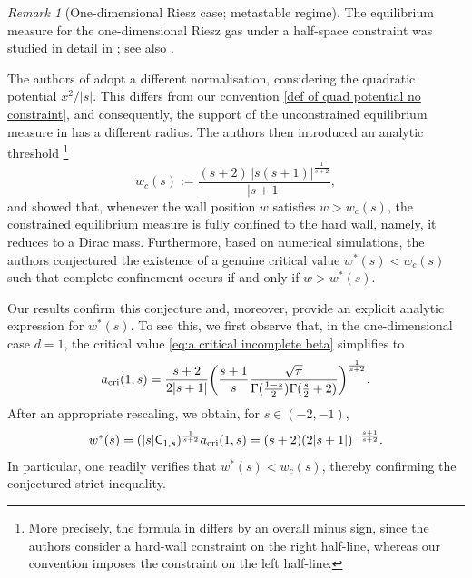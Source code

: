 \documentclass{amsart}
\theoremstyle{plain}
\theoremstyle{remark}
\newtheorem{rem}{Remark}%
\numberwithin{equation}{section}
\begin{document}
 
\begin{rem}[One-dimensional Riesz case; metastable regime] The equilibrium measure for the one-dimensional Riesz gas under a half-space constraint was studied in detail in \cite{KKKMMS21}; see also \cite{KKKMMS22,KKKMMS24}. 

The authors of \cite{KKKMMS21} adopt a different normalisation, considering the quadratic potential $x^2/|s|$. This differs from our convention \eqref{def of quad potential no constraint},
and consequently, the support of the unconstrained equilibrium measure in \cite{KKKMMS21} has a different radius.
The authors then introduced an analytic threshold
\cite[Eq.~(18)]{KKKMMS21}\footnote{More precisely, the formula in \cite[Eq.~(18)]{KKKMMS21} differs by an overall minus sign, since the authors consider a hard-wall constraint on the right half-line, whereas our convention imposes the constraint on the left half-line.}
\begin{equation}
    w_c(s):=\frac{(s+2)\,|s(s+1)|^{\frac{1}{s+2}}}{|s+1|},
\end{equation}
and showed that, whenever the wall position $w$ satisfies $w>w_c(s)$, the constrained equilibrium measure is fully confined to the hard wall, namely, it reduces to a Dirac mass. 
Furthermore, based on numerical simulations, the authors conjectured the existence of a genuine critical value $w^*(s)<w_c(s)$ such that complete confinement occurs if and only if $w>w^*(s)$.

Our results confirm this conjecture and, moreover, provide an explicit analytic expression for $w^*(s)$. To see this, we first observe that, in the one-dimensional case $d=1$, the critical value \eqref{eq:a critical incomplete beta} simplifies to
\begin{equation}  \label{def of critical value d=1}
a_{\rm cri}(1,s) = \frac{s+2}{2|s+1|}\bigg(\frac{s+1}{s}\frac{\sqrt{\pi}}{\Gamma(\frac{1-s}{2})\Gamma(\frac{s}{2}+2)}\bigg)^{\frac{1}{s+2}}. 
\end{equation}   
After an appropriate rescaling, we obtain, for $s\in(-2,-1)$, 
\begin{equation}\label{eq:true w^*(s)}
    w^*(s) = (|s|\mathsf{C}_{1,s})^{\frac{1}{s+2}}a_{\rm cri}(1,s) = (s+2)(2|s+1|)^{-\frac{s+1}{s+2}}.  
\end{equation}
In particular, one readily verifies that $w^*(s) < w_c(s)$, thereby confirming the conjectured strict inequality.  


\end{rem}
\end{document}
